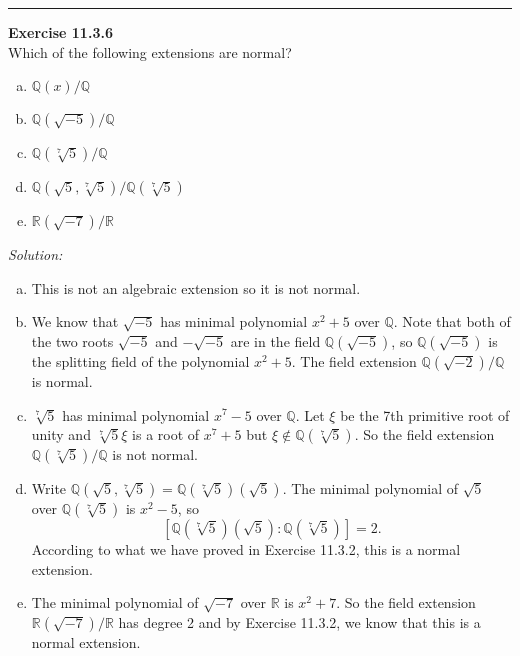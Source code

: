 \documentclass[a4paper, 12pt]{article}
\newenvironment{problem}[2][Exercise]
    { \begin{mdframed}[backgroundcolor=gray!20] \textbf{#1 #2} \\}
    {  \end{mdframed}}
\newenvironment{solution}
    {\textit{Solution:}}
    {}
\begin{document}
\noindent\rule{7in}{2.8pt}
\begin{problem}{11.3.6}
Which of the following extensions are normal?
\begin{enumerate}[(a)]
\item \(\mathbb{Q}(x)/\mathbb{Q}\)
\item \(\mathbb{Q}(\sqrt{-5})/\mathbb{Q}\)
\item \(\mathbb{Q}(\sqrt[7]{5})/\mathbb{Q}\)
\item \(\mathbb{Q}(\sqrt{5},\sqrt[7]{5})/\mathbb{Q}(\sqrt[7]{5})\)
\item \(\mathbb{R}(\sqrt{-7})/\mathbb{R}\)
\end{enumerate}	
\end{problem}
\begin{solution}
\begin{enumerate}[(a)]
\item This is not an algebraic extension so it is not normal. 
\item We know that \(\sqrt{-5}\) has minimal polynomial \(x^2+5\) over \(\mathbb{Q}\). Note that both of the two roots \(\sqrt{-5}\) and \(-\sqrt{-5}\) are in the field \(\mathbb{Q}(\sqrt{-5})\), so 
\(\mathbb{Q}(\sqrt{-5})\) is the splitting field of the polynomial \(x^2+5\). The field extension \(\mathbb{Q}(\sqrt{-2})/\mathbb{Q}\) is normal. 
\item \(\sqrt[7]{5}\) has minimal polynomial \(x^7-5\) over \(\mathbb{Q}\). Let \(\xi\) be the 7th primitive root of unity and \(\sqrt[7]{5}\xi\) is a root of \(x^7+5\) but \(\xi\notin \mathbb{Q}(\sqrt[7]{5})\). So the field extension 
\(\mathbb{Q}(\sqrt[7]{5})/\mathbb{Q}\) is not normal. 
\item Write \(\mathbb{Q}(\sqrt{5},\sqrt[7]{5})=\mathbb{Q}(\sqrt[7]{5})(\sqrt{5})\). The minimal polynomial of \(\sqrt{5}\) over \(\mathbb{Q}(\sqrt[7]{5})\) is \(x^2-5\), so 
\[[\mathbb{Q}(\sqrt[7]{5})(\sqrt{5}):\mathbb{Q}(\sqrt[7]{5})]=2.\]
According to what we have proved in Exercise 11.3.2, this is a normal extension. 
\item The minimal polynomial of \(\sqrt{-7}\) over \(\mathbb{R}\) is \(x^2+7\). So the field extension \(\mathbb{R}(\sqrt{-7})/\mathbb{R}\) has degree 2 and by Exercise 11.3.2, we know that this is a normal extension. 
\end{enumerate}
\end{solution}
\end{document}
